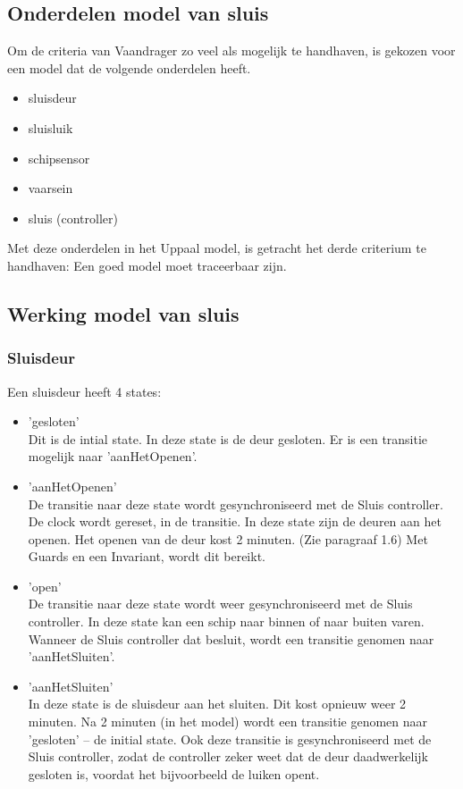 \documentclass{article} %
\begin{document}
\subsection{Onderdelen model van sluis}

Om de criteria van Vaandrager zo veel als mogelijk te handhaven, is gekozen voor een model dat de volgende onderdelen heeft.
\begin{itemize}
    \item sluisdeur
    \item sluisluik
    \item schipsensor
    \item vaarsein
    \item sluis (controller)
\end{itemize}

Met deze onderdelen in het Uppaal model, is getracht het derde criterium te handhaven: Een goed model moet traceerbaar zijn.
\newpage

\subsection{Werking model van sluis}

\subsubsection{Sluisdeur}

Een sluisdeur heeft 4 states:

\begin{itemize}
    \item 'gesloten' \\
        Dit is de intial state. In deze state is de deur gesloten. Er is een transitie mogelijk naar 'aanHetOpenen'.
    \item 'aanHetOpenen' \\
        De transitie naar deze state wordt gesynchroniseerd met de Sluis controller. De clock wordt gereset, in de transitie. In deze state zijn de deuren aan het openen. Het openen van de deur kost 2 minuten. (Zie paragraaf 1.6) Met Guards en een Invariant, wordt dit bereikt.
    \item 'open' \\
        De transitie naar deze state wordt weer gesynchroniseerd met de Sluis controller. In deze state kan een schip naar binnen of naar buiten varen. Wanneer de Sluis controller dat besluit, wordt een transitie genomen naar 'aanHetSluiten'.
    \item 'aanHetSluiten' \\
        In deze state is de sluisdeur aan het sluiten. Dit kost opnieuw weer 2 minuten. Na 2 minuten (in het model) wordt een transitie genomen naar 'gesloten' -- de initial state. Ook deze transitie is gesynchroniseerd met de Sluis controller, zodat de controller zeker weet dat de deur daadwerkelijk gesloten is, voordat het bijvoorbeeld de luiken opent. 
    
\end{itemize}
\end{document}
